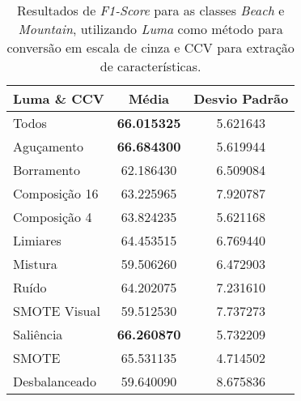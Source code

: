 

\begin{table}[H]
\begin{center}
\caption{Resultados de \textit{F1-Score} para as classes \textit{Beach} e \textit{Mountain}, utilizando \emph{Luma} como método para conversão em escala de cinza e CCV para extração de características.}
\label{tab:resultados:2:melhor}
\begin{tabular}{|l|c|c|}
\hline
\textbf{Luma \& CCV} & \textbf{Média}     & \textbf{Desvio Padrão} \\ \hline
   Todos        & \textbf{66.015325} & 5.621643  \\ \hline
  Aguçamento    & \textbf{66.684300} & 5.619944  \\ \hline
  Borramento    & 62.186430 & 6.509084  \\ \hline
  Composição 16 & 63.225965 & 7.920787  \\ \hline
  Composição 4  & 63.824235 & 5.621168  \\ \hline
  Limiares      & 64.453515 & 6.769440  \\ \hline
  Mistura       & 59.506260 & 6.472903  \\ \hline
  Ruído         & 64.202075 & 7.231610  \\ \hline
  SMOTE Visual  & 59.512530 & 7.737273  \\ \hline
  Saliência     & \textbf{66.260870} & 5.732209  \\ \hline
 SMOTE          & 65.531135 & 4.714502  \\ \hline
Desbalanceado   & 59.640090 & 8.675836  \\ \hline
\end{tabular}
\end{center}
\end{table}

